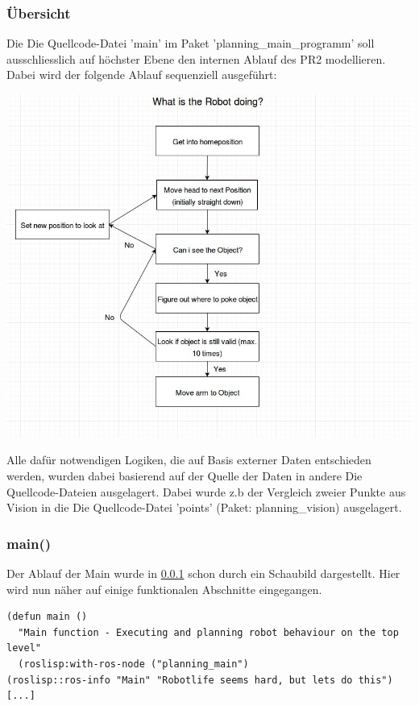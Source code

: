 \documentclass{suturo}
\begin{document}
\subsubsection{\"Ubersicht}\label{sec:main}
Die Die Quellcode-Datei 'main' im Paket 'planning\_main\_programm' soll ausschliesslich auf höchster Ebene den internen Ablauf des PR2 modellieren. Dabei wird der folgende Ablauf sequenziell ausgef\"uhrt:\\
\begin{center} \includegraphics[width=1.0\textwidth]{img/diagramm.jpg} \end{center}
Alle dafür notwendigen Logiken, die auf Basis externer Daten entschieden werden, wurden dabei basierend auf der Quelle der Daten in andere Die Quellcode-Dateien ausgelagert. Dabei wurde z.b der Vergleich zweier Punkte aus Vision in die Die Quellcode-Datei 'points' (Paket: planning\_vision) ausgelagert.


\subsubsection{main()}

Der Ablauf der Main wurde in \ref{sec:main} schon durch ein Schaubild dargestellt. Hier wird nun näher auf einige funktionalen Abschnitte eingegangen.



\noindent
\begin{minipage}{\linewidth}
\begin{lstlisting}
(defun main ()
  "Main function - Executing and planning robot behaviour on the top level"
  (roslisp:with-ros-node ("planning_main")
(roslisp::ros-info "Main" "Robotlife seems hard, but lets do this")
[...]
\end{lstlisting}
\end{minipage}
\end{document}

